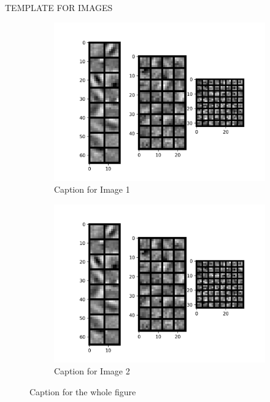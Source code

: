 \documentclass{report}
\begin{document}
TEMPLATE FOR IMAGES

\begin{figure}[t!]
  \centering
  \hspace{-2cm}
  \begin{subfigure}[t]{0.49\textwidth}
    \centering
    \includegraphics[width=1.3\textwidth]{3.CNN_500_sample/CNN_filters.png}
    \caption{Caption for Image 1}
    \label{fig:image-set1-sub1}
  \end{subfigure}
  \hspace{-0.5cm}
  \begin{subfigure}[t]{0.49\textwidth}
    \centering
    \includegraphics[width=1.3\textwidth]{3.CNN_500_sample/CNN_filters.png}
    \caption{Caption for Image 2}
    \label{fig:image-set1-sub2}
  \end{subfigure}

  \caption{Caption for the whole figure}
  \label{fig:figure}
\end{figure}
\end{document}
